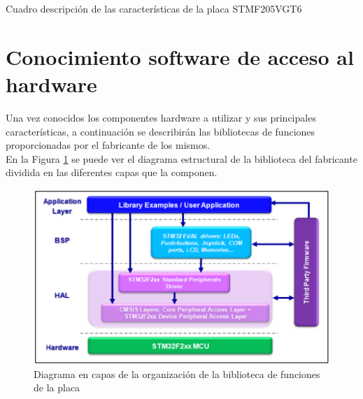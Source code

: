 \begin{table}[h!]
\centering

\caption {Cuadro descripción de las características de la placa STMF205VGT6}
\label{tab:BoardTable}
\end{table}


\section{Conocimiento software de acceso al hardware}
\label{obj2}
Una vez conocidos los componentes hardware  a utilizar y sus principales características, a continuación se describirán las bibliotecas de funciones proporcionadas por el fabricante de los mismos.\\

En la Figura \ref{fig:LibraryArch} se puede ver el diagrama estructural de la biblioteca del fabricante dividida en las diferentes capas que la componen.\\

\begin{figure}[!h]
\begin{center}
\includegraphics[width=1\textwidth]{figs/LibraryArch.png}
\caption{Diagrama en capas de la organización de la biblioteca de funciones de la placa}
\label{fig:LibraryArch}
\end{center}
\end{figure}

